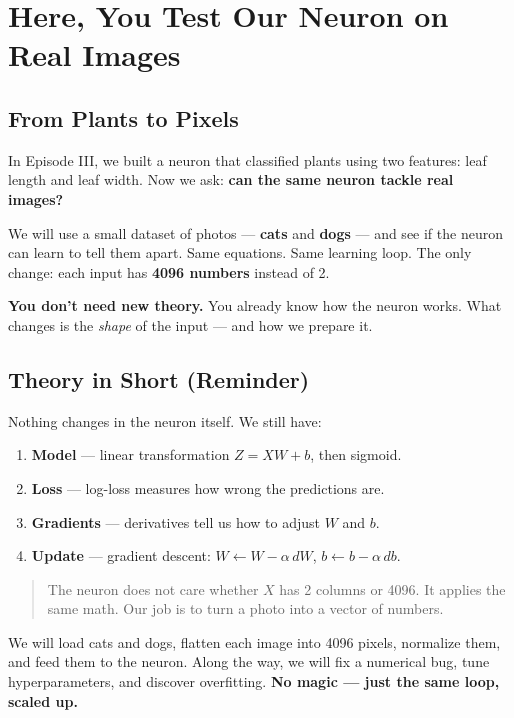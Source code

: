\documentclass[11pt]{article}
\begin{document}
\section*{Here, You Test Our Neuron on Real Images}

\subsection*{From Plants to Pixels}

In Episode III, we built a neuron that classified plants using two features: leaf length and leaf width.  
Now we ask: \textbf{can the same neuron tackle real images?}

We will use a small dataset of photos — \textbf{cats} and \textbf{dogs} — and see if the neuron can learn to tell them apart.  
Same equations. Same learning loop. The only change: each input has \textbf{4096 numbers} instead of 2.

\begin{tcolorbox}[colback=gray!5, colframe=gray!60!black]
\textbf{You don't need new theory.}  
You already know how the neuron works.  
What changes is the \emph{shape} of the input — and how we prepare it.
\end{tcolorbox}

\subsection*{Theory in Short (Reminder)}

Nothing changes in the neuron itself.  
We still have:
\begin{enumerate}
    \item \textbf{Model} — linear transformation $Z = XW + b$, then sigmoid.
    \item \textbf{Loss} — log-loss measures how wrong the predictions are.
    \item \textbf{Gradients} — derivatives tell us how to adjust $W$ and $b$.
    \item \textbf{Update} — gradient descent: $W \leftarrow W - \alpha \, dW$, $b \leftarrow b - \alpha \, db$.
\end{enumerate}

\begin{quote}
The neuron does not care whether $X$ has 2 columns or 4096.  
It applies the same math. Our job is to turn a photo into a vector of numbers.
\end{quote}


\begin{tcolorbox}[colback=gray!3, colframe=black!40, title=Let's test our neuron on images, fonttitle=\bfseries, arc=2mm]
We will load cats and dogs, flatten each image into 4096 pixels, normalize them, and feed them to the neuron.  
Along the way, we will fix a numerical bug, tune hyperparameters, and discover overfitting.  
\textbf{No magic — just the same loop, scaled up.}
\end{tcolorbox}
\end{document}
